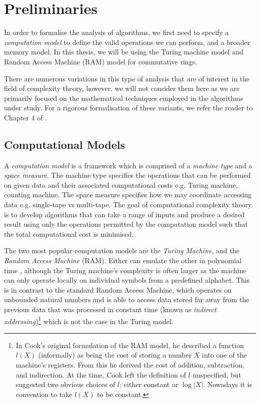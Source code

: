 \chapter{Preliminaries}\label{chp:preliminaries}

In order to formalise the analysis of algorithms, we first need to specify a \emph{computation model} to define the valid operations we can perform, and a broader memory model. In this thesis, we will be using the Turing machine model and Random Access Machine (RAM) model for commutative rings.

There are numerous variations in this type of analysis that are of interest in the field of complexity theory, however, we will not consider them here as we are primarily focused on the mathematical techniques employed in the algorithms under study. For a rigorous formalisation of these variants, we refer the reader to Chapter 4 of \cite{burgisser}.

\section{Computational Models}%
\label{sec:computations-models}

A \textit{computation model} is a framework which is comprised of a \textit{machine type} and a \textit{space measure}. The machine type specifies the operations that can be performed on given data and their associated computational costs e.g. Turing machine, counting machine. The space measure specifies how we may coordinate accessing data e.g. single-tape vs multi-tape. The goal of computational complexity theory is to develop algorithms that can take a range of inputs and produce a desired result using only the operations permitted by the computation model such that the total computational cost is minimised.

The two most popular computation models are the \textit{Turing Machine}, and the \textit{Random Access Machine} (RAM). Either can emulate the other in polynomial time \cite{ram-model}, although the Turing machine's complexity is often larger as the machine can only operate locally on individual symbols from a predefined alphabet. This is in contrast to the standard Random Access Machine, which operates on unbounded natural numbers and is able to access data stored far away from the previous data that was processed in constant time (known as \textit{indirect addressing})\footnote{In Cook's original formulation of the RAM model, he described a function $l(X)$ (informally) as being the cost of storing a number $X$ into one of the machine's registers. From this he derived the cost of addition, subtraction, and indirection. At the time, Cook left the definition of $l$ unspecified, but suggested two obvious choices of $l$: either constant or $\log |X|$. Nowadays it is convention to take $l(X)$ to be constant.} which is not the case in the Turing model.

